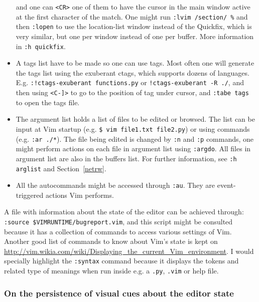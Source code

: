 \documentclass{article}
\newcommand{\ttt}[1] {
	\texttt{<#1>}}
\newcommand{\tttt}[1]{\texttt{#1}}
\begin{document}
\begin{itemize}
		and one can \ttt{CR} one of them to have the cursor in the main window active at
		the first character of the match.
		One might run \tttt{:lvim /section/ \%} and then \tttt{:lopen}
		to use the location-list window instead of the Quickfix, which
		is very similar, but one per window instead of one per buffer.
		More information in \tttt{:h quickfix}.
	\item A tags list have to be made so one can use tags.
		Most often one will generate the tags list using the exuberant ctags,
		which supports dozens of languages.
		E.g. \tttt{:!ctags-exuberant functions.py} or \tttt{!ctags-exuberant -R ./},
		and then using \ttt{C-]} to
		go to the position of tag under cursor, and \tttt{:tabe tags} to open
		the tags file.
	\item The argument list holds a list of files to be edited or browsed. 
		The list can be input at Vim startup (e.g. \tttt{\$ vim file1.txt file2.py})
	or using commands (e.g. \tttt{:ar ./*}).
		The file being edited is changed by \tttt{:n} and \tttt{:p} commands,
		one might perform actions on each file in argument list using \tttt{:argdo}.
		All files in argument list are also in the buffers list.
    For further information, see \tttt{:h arglist} and Section~\ref{netrw}.
  \item All the autocommands might be accessed through \tttt{:au}.
    They are event-triggered actions Vim performs.
\end{itemize}

A file with information about the state of the editor
can be achieved through: \tttt{:source \$VIMRUNTIME/bugreport.vim},
and this script might be consulted because it has
a collection of commands to access various settings of Vim.
Another good list of commands to know about Vim's state is kept on
\url{http://vim.wikia.com/wiki/Displaying_the_current_Vim_environment}.
I would specially highlight the \tttt{:syntax} command because
it displays the tokens and related type of meanings when run
inside e.g. a \tttt{.py}, \tttt{.vim} or help file.

\subsubsection{On the persistence of visual cues about the editor state}\label{visual1}
\end{document}
